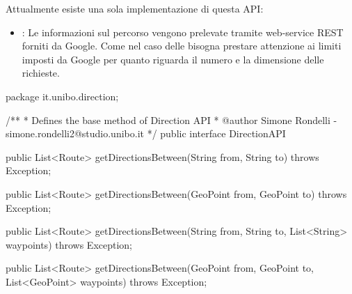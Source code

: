 Attualmente esiste una sola implementazione di questa API:

\begin{itemize}
	\item {}: Le informazioni sul percorso vengono prelevate tramite web-service REST forniti da Google. Come nel caso delle  bisogna prestare attenzione ai limiti imposti da Google per quanto riguarda il numero e la dimensione delle richieste.
\end{itemize}

\begin{java}[caption={Interfaccia di Direction API},label={lst:direction-api}]
package it.unibo.direction;

/**
 * Defines the base method of Direction API
 * @author Simone Rondelli - simone.rondelli2@studio.unibo.it
 */
public interface DirectionAPI {

        public List<Route> getDirectionsBetween(String from, String to) throws Exception;

        public List<Route> getDirectionsBetween(GeoPoint from, GeoPoint to) throws Exception;

        public List<Route> getDirectionsBetween(String from, String to, List<String> waypoints) throws Exception;

        public List<Route> getDirectionsBetween(GeoPoint from, GeoPoint to, List<GeoPoint> waypoints) throws Exception;

}
\end{java}